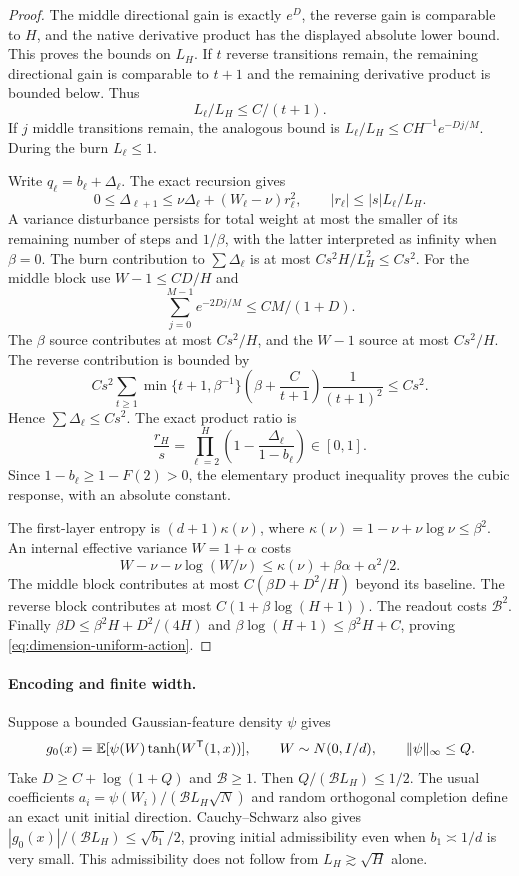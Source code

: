 \begin{proof}
The middle directional gain is exactly $e^D$, the reverse gain is comparable to $H$, and the native derivative product has the displayed absolute lower bound. This proves the bounds on $L_H$. If $t$ reverse transitions remain, the remaining directional gain is comparable to $t+1$ and the remaining derivative product is bounded below. Thus
\[
 L_\ell/L_H\le C/(t+1).
\]
If $j$ middle transitions remain, the analogous bound is
$L_\ell/L_H\le C H^{-1}e^{-Dj/M}$. During the burn $L_\ell\le1$.

Write $q_\ell=b_\ell+\Delta_\ell$. The exact recursion gives
\[
 0\le\Delta_{\ell+1}\le\nu\Delta_\ell+(W_\ell-\nu)r_\ell^2,
 \qquad |r_\ell|\le|s|L_\ell/L_H.
\]
A variance disturbance persists for total weight at most the smaller of its remaining number of steps and $1/\beta$, with the latter interpreted as infinity when $\beta=0$. The burn contribution to $\sum\Delta_\ell$ is at most
$Cs^2H/L_H^2\le Cs^2$. For the middle block use
$W-1\le CD/H$ and
\[
 \sum_{j=0}^{M-1}e^{-2Dj/M}\le C M/(1+D).
\]
The $\beta$ source contributes at most $Cs^2/H$, and the $W-1$ source at most $Cs^2/H$. The reverse contribution is bounded by
\[
 Cs^2\sum_{t\ge1}
 \min\{t+1,\beta^{-1}\}
 \left(\beta+\frac C{t+1}\right)\frac1{(t+1)^2}
 \le Cs^2.
\]
Hence $\sum\Delta_\ell\le Cs^2$. The exact product ratio is
\[
 \frac{r_H}{s}=\prod_{\ell=2}^H
      \left(1-\frac{\Delta_\ell}{1-b_\ell}\right)\in[0,1].
\]
Since $1-b_\ell\ge1-F(2)>0$, the elementary product inequality proves the cubic response, with an absolute constant.

The first-layer entropy is $(d+1)\kappa(\nu)$, where
$\kappa(\nu)=1-\nu+\nu\log\nu\le\beta^2$. An internal effective variance $W=1+\alpha$ costs
\[
 W-\nu-\nu\log(W/\nu)
 \le\kappa(\nu)+\beta\alpha+\alpha^2/2.
\]
The middle block contributes at most $C(\beta D+D^2/H)$ beyond its baseline. The reverse block contributes at most $C(1+\beta\log(H+1))$. The readout costs $\mathcal B^2$. Finally
$\beta D\le\beta^2H+D^2/(4H)$ and
$\beta\log(H+1)\le\beta^2H+C$, proving \eqref{eq:dimension-uniform-action}.
\end{proof}

\paragraph{Encoding and finite width.}
Suppose a bounded Gaussian-feature density $\psi$ gives
\[
 g_0(x)=\mathbb E[\psi(W)\tanh(W^{\mathsf T}(1,x))],
 \qquad W\sim N(0,I/d),\qquad\|\psi\|_\infty\le Q.
\]
Take $D\ge C+\log(1+Q)$ and $\mathcal B\ge1$. Then
$Q/(\mathcal B L_H)\le1/2$. The usual coefficients
$a_i=\psi(W_i)/(\mathcal B L_H\sqrt N)$ and random orthogonal completion define an exact unit initial direction. Cauchy--Schwarz also gives
$|g_0(x)|/(\mathcal B L_H)\le\sqrt{b_1}/2$, proving initial admissibility even when $b_1\asymp1/d$ is very small. This admissibility does not follow from $L_H\gtrsim\sqrt H$ alone.


